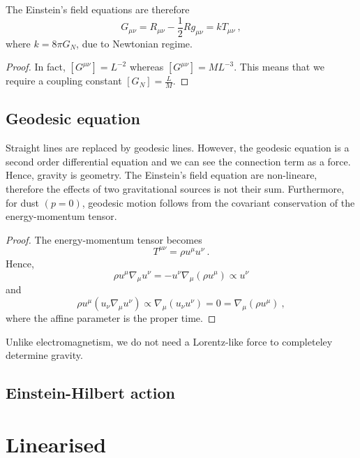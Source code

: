     The Einstein's field equations are therefore
    \begin{equation*}
        G_{\mu\nu} = R_{\mu\nu} - \frac{1}{2} R g_{\mu\nu} = k T_{\mu\nu} ~,
    \end{equation*}
    where $k = 8 \pi G_N$, due to Newtonian regime.
    \begin{proof}
        In fact, $[G^{\mu\nu}] = L^{-2}$ whereas $[G^{\mu\nu}] = M L^{-3}$. This means that we require a coupling constant $[G_N] = \frac{L}{M}$. 
    \end{proof}

\section{Geodesic equation} 

    Straight lines are replaced by geodesic lines. However, the geodesic equation is a second order differential equation and we can see the connection term as a force. Hence, gravity is geometry. The Einstein's field equation are non-lineare, therefore the effects of two gravitational sources is not their sum. Furthermore, for dust $(p = 0)$, geodesic motion follows from the covariant conservation of the energy-momentum tensor. 
    \begin{proof}
        The energy-momentum tensor becomes
        \begin{equation*}
            T^{\mu\nu} = \rho u^\mu u^\nu ~.
        \end{equation*}
        Hence, 
        \begin{equation*}
            \rho u^\mu \nabla_\mu u^\nu = - u^\nu \nabla_\mu (\rho u^\mu ) \propto u^\nu 
        \end{equation*}
        and 
        \begin{equation*}
            \rho u^\mu (u_\nu \nabla_\mu u^\nu) \propto \nabla_\mu (u_\nu u^\nu) = 0 = \nabla_\mu (\rho u^\mu) ~,
        \end{equation*}
        where the affine parameter is the proper time.
    \end{proof}

    Unlike electromagnetism, we do not need a Lorentz-like force to completeley determine gravity. 

\section{Einstein-Hilbert action} 

\chapter{Linearised}



